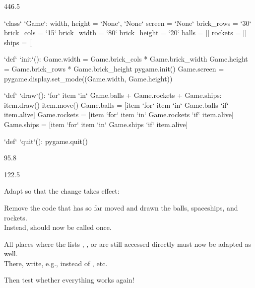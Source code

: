 \documentclass{aslab}
\newcommand*\Kw[1]{\textcolor{codeorange}{#1}}  %
\newcommand*\Cy[1]{\textcolor{codecyan}{#1}}    %
\newcommand*\Nu[1]{\textcolor{codered}{#1}}     %
\begin{document}
\begin{region}[pitch=12]{446.5}
\begin{codeblock}[escapechar=`]
`\Kw{class}` `\Cy{Game}`:
    width, height = `\Cy{None}`, `\Cy{None}`
    screen = `\Cy{None}`
    brick_rows = `\Nu{30}`
    brick_cols = `\Nu{15}`
    brick_width = `\Nu{80}`
    brick_height = `\Nu{20}`
    balls = []
    rockets = []
    ships = []

    `\Kw{def}` `\Cy{init}`():
        Game.width = Game.brick_cols * Game.brick_width
        Game.height = Game.brick_rows * Game.brick_height
        pygame.init()
        Game.screen = pygame.display.set_mode((Game.width, Game.height))

    `\Kw{def}` `\Cy{draw}`():
        `\Kw{for}` item `\Kw{in}` Game.balls + Game.rockets + Game.ships:
            item.draw()
            item.move()
        Game.balls = [item `\Kw{for}` item `\Kw{in}` Game.balls `\Kw{if}` item.alive]
        Game.rockets = [item `\Kw{for}` item `\Kw{in}` Game.rockets `\Kw{if}` item.alive]
        Game.ships = [item `\Kw{for}` item `\Kw{in}` Game.ships `\Kw{if}` item.alive]

    `\Kw{def}` `\Cy{quit}`():
        pygame.quit()
\end{codeblock}
\end{region}

\nextpage
\begin{region}{95.8}
\end{region}

\begin{region}[pitch=13.55]{122.5}
\begin{tasks}
\item Adapt  so that the change takes effect:
  \begin{dotlist}
  \item Remove the code that has so far moved and drawn the balls,
    spaceships, and rockets.\\
    Instead,  should now be called once.
  \item All places where the lists , , or
     are still accessed directly must now be adapted as
    well.\\
    There, write, e.g.,  instead of , etc.
  \item Then test whether everything works again!
  \end{dotlist}
\end{tasks}
\end{region}
\end{document}
